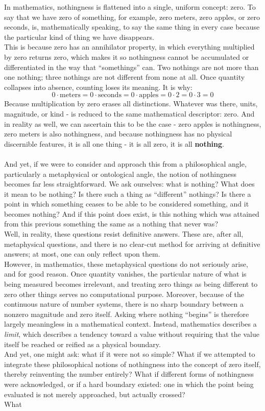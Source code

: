 \documentclass{article}
\begin{document}
In mathematics, nothingness is flattened into a single, uniform concept: zero. To say that we have zero of something, for example, zero meters, zero apples, or zero seconds, is, mathematically speaking, to say the same thing in every case because the particular kind of thing we have disappears. \\This is because zero has an annihilator property, in which everything multiplied by zero returns zero, which makes it so nothingness cannot be accumulated or differentiated in the way that “somethings” can. Two nothings are not more than one nothing; three nothings are not different from none at all. Once quantity collapses into absence, counting loses its meaning. It is why: $$0\cdot \text{meters}=0\cdot \text{seconds} = 0\cdot \text{apples} = 0 \cdot2=0\cdot3=0$$Because multiplication by zero erases all distinctions. Whatever was there, units, magnitude, or kind - is reduced to the same mathematical descriptor: zero. And in reality as well, we can ascertain this to be the case - zero apples is nothingness, zero meters is also nothingness, and because nothingness has no physical discernible features, it is all one thing - it is all zero, it is all \textbf{nothing}.\\\\ And yet, if we were to consider and approach this from a philosophical angle, particularly a metaphysical or ontological angle, the notion of nothingness becomes far less straightforward. We ask ourselves: what is nothing? What does it mean to be nothing? Is there such a thing as ``different'' nothings? Is there a point in which something ceases to be able to be considered something, and it becomes nothing? And if this point does exist, is this nothing which was attained from this previous something the same as a nothing that never was?\\Well, in reality, these questions resist definitive answers. These are, after all, metaphysical questions, and there is no clear-cut method for arriving at definitive answers; at most, one can only reflect upon them.\\ However, in mathematics, these metaphysical questions do not seriously arise, and for good reason. Once quantity vanishes, the particular nature of what is being measured becomes irrelevant, and treating zero things as being different to zero other things serves no computational purpose. Moreover, because of the continuous nature of number systems, there is no sharp boundary between a nonzero magnitude and zero itself. Asking where nothing “begins” is therefore largely meaningless in a mathematical context. Instead, mathematics describes a \textit{limit}, which describes a tendency toward a value without requiring that the value itself be reached or reified as a physical boundary. \\ And yet, one might ask: what if it were not so simple? What if we attempted to integrate these philosophical notions of nothingness into the concept of zero itself, thereby reinventing the number entirely? What if different forms of nothingness were acknowledged, or if a hard boundary existed: one in which the point being evaluated is not merely approached, but actually crossed? \\ What 
\end{document}
